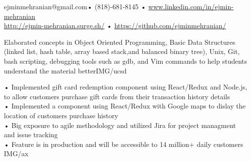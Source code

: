 \documentclass[paper=a4,fontsize=11pt]{temp} %
\begin{document}
\begin{minipage}{1.0\linewidth}
   
   
    ejminmehranian@gmail.com\hspace{0.5cm}• \hspace{0.5cm} (818)-681-8145 \hspace{0.5cm} • \hspace{0.5cm} \url {www.linkedin.com/in/ejmin-mehranian} \\ \url{http://ejmin-mehranian.surge.sh/} \hspace{0.41cm}• \hspace{0.6cm} \url{https://github.com/ejminmehranian/}
 
\end{minipage}

\noindent


{Elaborated concepts in Object Oriented Programming, Basic Data Structures (linked list, hash table, array based stack,and balanced binary tree), Unix, Git, bash scripting, debugging tools such as gdb, and Vim commands to help students understand the material better}{IMG/ucsd}

\noindent

{• Implemented gift card redemption component using React/Redux and Node.js, to allow customers purchase gift cards from their transaction history details
\\ • Implemented a component using React/Redux with Google maps to dislay the location of customers purchase history
\\ • Big exposure to agile methodology and utilized Jira for project managment and issue tracking
\\ • Feature is in production and will be accessible to 14 million+ daily customers
} {IMG/ax}
\end{document}
